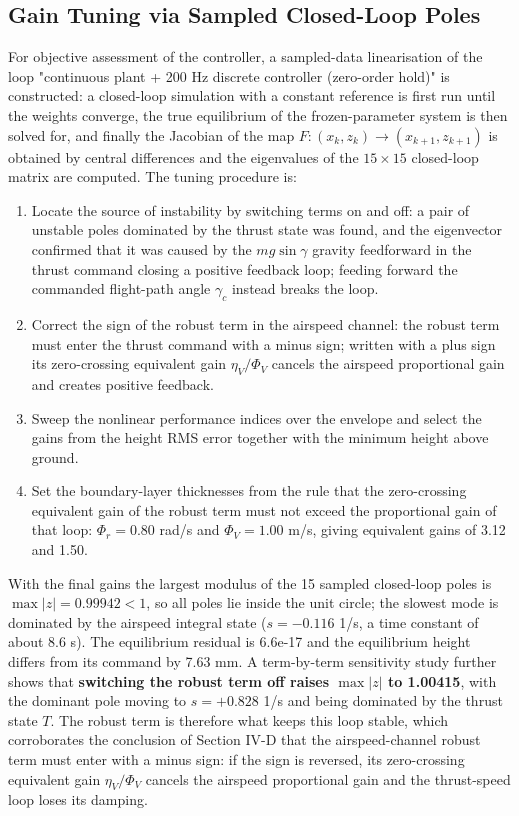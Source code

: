 \documentclass[conference]{IEEEtran}
\begin{document}
\subsection{Gain Tuning via Sampled Closed-Loop Poles}
For objective assessment of the controller, a sampled-data linearisation of the loop "continuous plant + 200 Hz discrete controller (zero-order hold)" is constructed: a closed-loop simulation with a constant reference is first run until the weights converge, the true equilibrium of the frozen-parameter system is then solved for, and finally the Jacobian of the map $F:(x_k,z_k) \to (x_{k+1},z_{k+1})$ is obtained by central differences and the eigenvalues of the $15 \times 15$ closed-loop matrix are computed. The tuning procedure is:

\begin{enumerate}
  \item Locate the source of instability by switching terms on and off: a pair of unstable poles dominated by the thrust state was found, and the eigenvector confirmed that it was caused by the $mg\sin\gamma$ gravity feedforward in the thrust command closing a positive feedback loop; feeding forward the commanded flight-path angle $\gamma_c$ instead breaks the loop.
  \item Correct the sign of the robust term in the airspeed channel: the robust term must enter the thrust command with a minus sign; written with a plus sign its zero-crossing equivalent gain $\eta_V/\Phi_V$ cancels the airspeed proportional gain and creates positive feedback.
  \item Sweep the nonlinear performance indices over the envelope and select the gains from the height RMS error together with the minimum height above ground.
  \item Set the boundary-layer thicknesses from the rule that the zero-crossing equivalent gain of the robust term must not exceed the proportional gain of that loop: $\Phi_r = 0.80$ rad/s and $\Phi_V = 1.00$ m/s, giving equivalent gains of 3.12 and 1.50.
\end{enumerate}

With the final gains the largest modulus of the 15 sampled closed-loop poles is $\max|z| = 0.99942 < 1$, so all poles lie inside the unit circle; the slowest mode is dominated by the airspeed integral state ($s = -0.116$ 1/s, a time constant of about 8.6 s). The equilibrium residual is 6.6e-17 and the equilibrium height differs from its command by 7.63 mm. A term-by-term sensitivity study further shows that \textbf{switching the robust term off raises $\max|z|$ to 1.00415}, with the dominant pole moving to $s = +0.828$ 1/s and being dominated by the thrust state $T$. The robust term is therefore what keeps this loop stable, which corroborates the conclusion of Section IV-D that the airspeed-channel robust term must enter with a minus sign: if the sign is reversed, its zero-crossing equivalent gain $\eta_V/\Phi_V$ cancels the airspeed proportional gain and the thrust-speed loop loses its damping.
\end{document}
